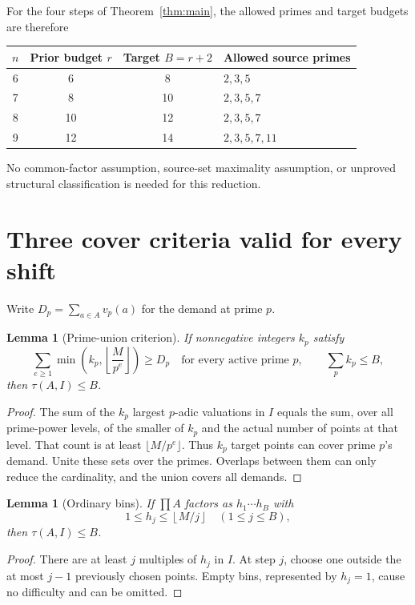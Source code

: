 \documentclass[11pt,a4paper]{article}
\newtheorem{lemma}[theorem]{Lemma}
\begin{document}
For the four steps of Theorem~\ref{thm:main}, the allowed primes and target budgets are therefore
\begin{center}
\begin{tabular}{@{}cccl@{}}
\toprule
$n$ & Prior budget $r$ & Target $B=r+2$ & Allowed source primes\\
\midrule
6&6&8&$2,3,5$\\
7&8&10&$2,3,5,7$\\
8&10&12&$2,3,5,7$\\
9&12&14&$2,3,5,7,11$\\
\bottomrule
\end{tabular}
\end{center}
No common-factor assumption, source-set maximality assumption, or unproved structural classification is needed for this reduction.

\section{Three cover criteria valid for every shift}\label{sec:criteria}
Write $D_p=\sum_{a\in A}v_p(a)$ for the demand at prime $p$.

\begin{lemma}[Prime-union criterion]\label{lem:union}
If nonnegative integers $k_p$ satisfy
\[
 \sum_{e\ge1}\min\!\left(k_p,\left\lfloor\frac{M}{p^e}\right\rfloor\right)
 \ge D_p\quad\text{for every active prime }p,
 \qquad \sum_p k_p\le B,
\]
then $\tau(A,I)\le B$.
\end{lemma}
\begin{proof}
The sum of the $k_p$ largest $p$-adic valuations in $I$ equals the sum, over all prime-power levels, of the smaller of $k_p$ and the actual number of points at that level. That count is at least $\lfloor M/p^e\rfloor$. Thus $k_p$ target points can cover prime $p$'s demand. Unite these sets over the primes. Overlaps between them can only reduce the cardinality, and the union covers all demands.
\end{proof}

\begin{lemma}[Ordinary bins]\label{lem:bins}
If $\prod A$ factors as $h_1\cdots h_B$ with
\[
 1\le h_j\le\left\lfloor M/j\right\rfloor\quad(1\le j\le B),
\]
then $\tau(A,I)\le B$.
\end{lemma}
\begin{proof}
There are at least $j$ multiples of $h_j$ in $I$. At step $j$, choose one outside the at most $j-1$ previously chosen points. Empty bins, represented by $h_j=1$, cause no difficulty and can be omitted.
\end{proof}
\end{document}
